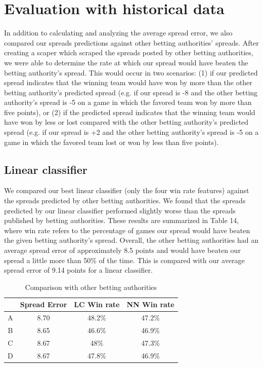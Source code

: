 \documentclass{article}
\begin{document}
\section{Evaluation with historical data}
In addition to calculating and analyzing the average spread error, we also compared our spreads predictions against other betting authorities' spreads. After creating a scaper which scraped the spreads posted by other betting authorities, we were able to determine the rate at which our spread would have beaten the betting authority's spread. This would occur in two scenarios: (1) if our predicted spread indicates that the winning team would have won by more than the other betting authority's predicted spread (e.g. if our spread is -8 and the other betting authority's spread is -5 on a game in which the favored team won by more than five points), or (2) if the predicted spread indicates that the winning team would have won by less or lost compared with the other betting authority's predicted spread (e.g. if our spread is +2 and the other betting authority's spread is -5 on a game in which the favored team lost or won by less than five points).

\subsection{Linear classifier}
We compared our best linear classifier (only the four win rate features) against the spreads predicted by other betting authorities. We found that the spreads predicted by our linear classifier performed slightly worse than the spreads published by betting authorities. These results are summarized in Table 14, where win rate refers to the percentage of games our spread would have beaten the given betting authority's spread. Overall, the other betting authorities had an average spread error of approximately 8.5 points and would have beaten our spread a little more than 50\% of the time. This is compared with our average spread error of 9.14 points for a linear classifier.

\begin{table}
  \begin{center}
    \begin{tabular}{ | c | c | c | c| }
      \hline
                       & Spread Error      &LC  Win rate &NN Win rate \\ \hline
       A      & 8.70              & 48.2\% &47.2\%   \\ \hline
      B      & 8.65              & 46.6\%  &46.9\%  \\ \hline
      C      & 8.67              & 48\%      &47.3\%	\\ \hline
	D      & 8.67              & 47.8\%    &46.9\%\\ \hline
    \end{tabular}
  \end{center}
  \caption{Comparison with other betting authorities}
\end{table}
\end{document}
